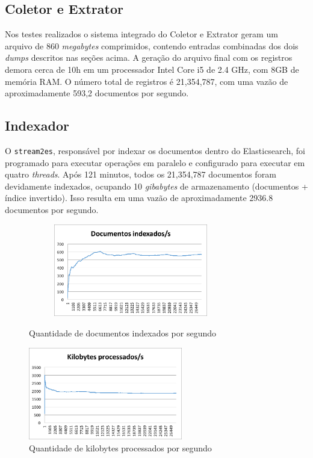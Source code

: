 \documentclass[12pt]{article}
\begin{document}
\subsection{Coletor e Extrator}

Nos testes realizados o sistema integrado do Coletor e Extrator geram um arquivo de 860 \emph{megabytes} comprimidos, contendo entradas combinadas dos dois \emph{dumps} descritos nas seções acima. A geração do arquivo final com os registros demora cerca de 10h em um processador Intel Core i5 de 2.4 GHz, com 8GB de memória RAM. O número total de registros é 21,354,787, com uma vazão de aproximadamente 593,2 documentos por segundo.

\subsection{Indexador}

O \texttt{stream2es}, responsável por indexar os documentos dentro do Elasticsearch, foi programado para executar operações em paralelo e configurado para executar em quatro \emph{threads}. Após 121 minutos, todos os 21,354,787 documentos foram devidamente indexados, ocupando 10 \emph{gibabytes} de armazenamento (documentos + índice invertido). Isso resulta em uma vazão de aproximadamente 2936.8 documentos por segundo.

\begin{figure}
    \centering
    \includegraphics[width=0.6\textwidth]{img/docps}
    \caption{Quantidade de documentos indexados por segundo}
    \label{docs_p_sec}
\end{figure}

\begin{figure}
    \centering
    \includegraphics[width=0.6\textwidth]{img/dataps}
    \caption{Quantidade de kilobytes processados por segundo}
    \label{kb_p_sec}
\end{figure}
\end{document}

